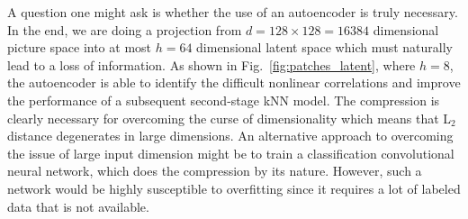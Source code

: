 A question one might ask is whether the use of an autoencoder is truly necessary. In the end, we are doing a projection from $d=128\times128=16384$ dimensional picture space into at most $h=64$ dimensional latent space which must naturally lead to a loss of information. As shown in Fig.~\ref{fig:patches_latent}, where $h=8$, the autoencoder is able to identify the difficult nonlinear correlations and improve the performance of a subsequent second-stage kNN model. The compression is clearly necessary for overcoming the curse of dimensionality which means that L$_2$ distance degenerates in large dimensions. An alternative approach to overcoming the issue of large input dimension might be to train a classification convolutional neural network, which does the compression by its nature. However, such a network would be highly susceptible to overfitting since it requires a lot of labeled data that is not available.

